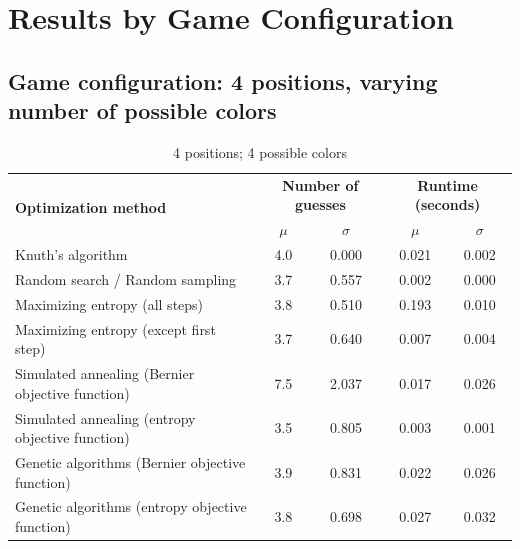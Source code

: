 \documentclass[11pt]{article}
\begin{document}
\newpage
\section{Results by Game Configuration}

\subsection*{Game configuration: 4 positions, varying number of possible colors}

\begin{table}[h!]
\begin{center}
\begin{tabular}{l c c c c}
\toprule
\multirow{2}{*}{\bfseries Optimization method} 		& \multicolumn{2}{c}{\bfseries Number of guesses} 		& \multicolumn{2}{c}{\bfseries Runtime (seconds)}	\\
\cmidrule(lr){2-3}  \cmidrule(lr){4-5}				& $\mu$ & $\sigma$								& $\mu$ & $\sigma$							\\
\cmidrule(lr){1-5}
Knuth's algorithm							& 4.0 & 0.000									& 0.021 & 0.002							\\
Random search / Random sampling				& 3.7 & 0.557									& 0.002 & 0.000							\\
Maximizing entropy (all steps)					& 3.8 & 0.510									& 0.193 & 0.010							\\
Maximizing entropy (except first step)			& 3.7 & 0.640									& 0.007 & 0.004							\\
Simulated annealing (Bernier objective function)	& 7.5 & 2.037									& 0.017 & 0.026							\\
Simulated annealing (entropy objective function)	& 3.5 & 0.805									& 0.003 & 0.001							\\
Genetic algorithms (Bernier objective function)		& 3.9 & 0.831									& 0.022 &	0.026							\\
Genetic algorithms (entropy objective function)		& 3.8 & 0.698									& 0.027 & 0.032							\\
\bottomrule
\end{tabular}
\end{center}
\caption{4 positions; 4 possible colors}
\label{fig:compare_4_4}
\end{table}
\end{document}
